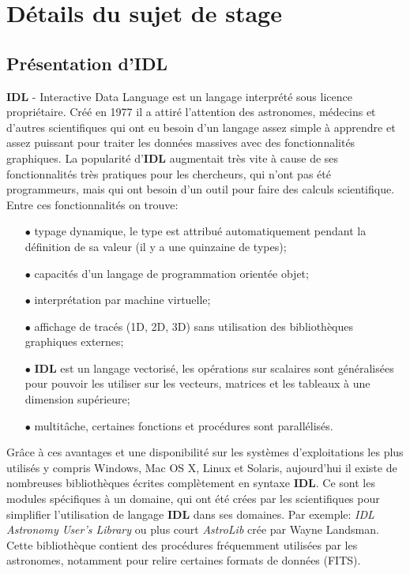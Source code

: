 \section{Détails du sujet de stage}
\subsection{Présentation d'IDL}

\textbf{IDL} - Interactive Data Language est un langage interprété sous licence propriétaire. Créé en 1977 il a attiré l'attention des astronomes, médecins et d'autres scientifiques qui ont eu besoin d'un langage assez simple à apprendre et assez puissant pour traiter les données massives avec des fonctionnalités graphiques. La popularité d'\textbf{IDL} augmentait très vite à cause de ses fonctionnalités très pratiques pour les chercheurs, qui n'ont pas été programmeurs, mais qui ont besoin d'un outil pour faire des calculs scientifique. Entre ces fonctionnalités on trouve:

\begin{itemize}
	\item[$\bullet$] typage dynamique, le type est attribué automatiquement pendant la définition  de sa valeur (il y a une quinzaine de types);
	\item[$\bullet$] capacités d'un langage de programmation orientée objet;
	\item[$\bullet$] interprétation par machine virtuelle;
	\item[$\bullet$] affichage de tracés (1D, 2D, 3D) sans utilisation des bibliothèques graphiques externes;
	\item[$\bullet$] \textbf{IDL} est un langage vectorisé, les opérations sur scalaires sont généralisées pour pouvoir les utiliser sur les vecteurs, matrices et les tableaux à une dimension supérieure;
	\item[$\bullet$] multitâche, certaines fonctions et procédures sont parallélisés.
\end{itemize}

Grâce à ces avantages et une disponibilité sur les systèmes d'exploitations les plus utilisés y compris Windows, Mac OS X, Linux et Solaris, aujourd'hui il existe de nombreuses bibliothèques écrites complètement en syntaxe \textbf{IDL}. Ce sont les modules spécifiques à un domaine, qui ont été crées par les scientifiques pour simplifier l'utilisation de langage \textbf{IDL} dans ses domaines. Par exemple:  \textit{IDL Astronomy User's Library} ou plus court \textit{AstroLib} crée par Wayne Landsman. Cette bibliothèque contient des procédures fréquemment utilisées par les astronomes, notamment pour relire certaines formats de données (FITS).

